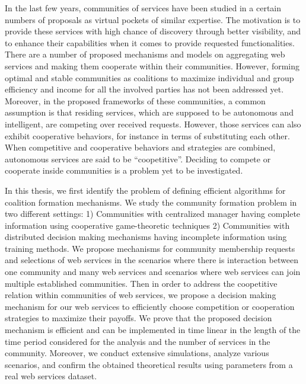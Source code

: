 
In the last few years, communities of services have been studied in a certain numbers of proposals as virtual pockets of similar expertise. The motivation is to provide these services with high chance of discovery through better visibility, and to enhance their capabilities when it comes to provide requested functionalities. There are a number of proposed mechanisms and models on aggregating web services and making them cooperate within their communities. However, forming optimal and stable communities as coalitions to maximize individual and group efficiency and income for all the involved parties has not been addressed yet. Moreover, in the proposed frameworks of these communities, a common assumption is that residing services, which are supposed to be autonomous and intelligent, are competing over received requests. However, those services can also exhibit cooperative behaviors, for instance in terms of substituting each other. When competitive and cooperative behaviors and strategies are combined, autonomous services are said to be ``coopetitive''. Deciding to compete or cooperate inside communities is a problem yet to be investigated.

In this thesis, we first identify the problem of defining efficient algorithms for coalition formation mechanisms. We study the community formation problem in two different settings: 1) Communities with centralized manager having complete information using cooperative game-theoretic techniques 2) Communities with distributed decision making mechanisms having incomplete information using training methods. We propose mechanisms for community membership requests and selections of web services in the scenarios where there is interaction between one community and many web services and scenarios where web services can join multiple established communities. Then in order to address the coopetitive relation within communities of web services, we propose a decision making mechanism for our web services to efficiently choose competition or cooperation strategies to maximize their payoffs. We prove that the proposed decision mechanism is efficient and can be implemented in time linear in the length of the time period considered for the analysis and the number of services in the community. Moreover, we conduct extensive simulations, analyze various scenarios, and confirm the obtained theoretical results using parameters from a real web services dataset.


